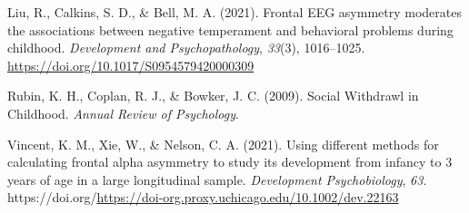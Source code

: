 \documentclass[
  man,
  floatsintext,
  longtable,
  nolmodern,
  notxfonts,
  notimes,
  colorlinks=true,linkcolor=blue,citecolor=blue,urlcolor=blue]{apa7}
\newlength{\cslhangindent}
\newenvironment{CSLReferences}[2] %
 {\begin{list}{}{%
  \setlength{\itemindent}{0pt}
  \setlength{\leftmargin}{0pt}
  \setlength{\parsep}{0pt}
  \ifodd #1
   \setlength{\leftmargin}{\cslhangindent}
   \setlength{\itemindent}{-1\cslhangindent}
  \fi
  \setlength{\itemsep}{#2\baselineskip}}}
 {\end{list}}
\begin{document}
\begin{CSLReferences}{1}{0}
Liu, R., Calkins, S. D., \& Bell, M. A. (2021). Frontal {EEG} asymmetry
moderates the associations between negative temperament and behavioral
problems during childhood. \emph{Development and Psychopathology},
\emph{33}(3), 1016--1025.
\url{https://doi.org/10.1017/S0954579420000309}

Rubin, K. H., Coplan, R. J., \& Bowker, J. C. (2009). Social {Withdrawl}
in {Childhood}. \emph{Annual Review of Psychology}.

Vincent, K. M., Xie, W., \& Nelson, C. A. (2021). Using different
methods for calculating frontal alpha asymmetry to study its development
from infancy to 3 years of age in a large longitudinal sample.
\emph{Development Psychobiology}, \emph{63}.
https://doi.org/\url{https://doi-org.proxy.uchicago.edu/10.1002/dev.22163}

\end{CSLReferences}
\end{document}
